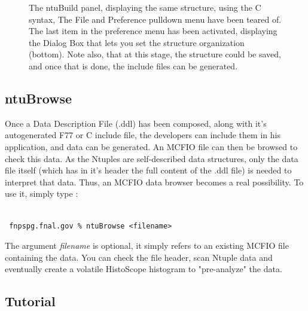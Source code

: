 \begin{figure}
\begin{center}
\leavevmode
\epsfysize=350pt
\caption{The ntuBuild panel, displaying the same structure, using the C syntax,
The File and Preference pulldown menu have been teared of.  The last item in the
preference menu  has been activated, displaying the Dialog Box that lets you
set the structure organization (bottom).  Note also, that at this stage, the
structure could be saved, and once that is done, the include files can be
generated. }
\label{ntuBuild2}
\end{center}
\end{figure}

\subsection{ntuBrowse}

Once a Data Description File (.ddl) has been composed, along with it's
autogenerated F77 or C include file, the developers can include them in his
application, and data can be generated.  An MCFIO file can then be browsed to
check  this data.  As the Ntuples are self-described data structures, only the
data file itself (which has in it's header the full content of the .ddl file) is
needed to interpret that data.  Thus, an MCFIO data browser becomes a real
possibility. To use it, simply type :

\begin{verbatim}

 fnpspg.fnal.gov % ntuBrowse <filename>

\end{verbatim}

	The argument {\em filename} is optional, it simply refers to an
existing MCFIO file containing the data.  You can check the file header, scan
Ntuple data and eventually create a volatile HistoScope histogram to
"pre-analyze" the data.



\subsection{Tutorial}

